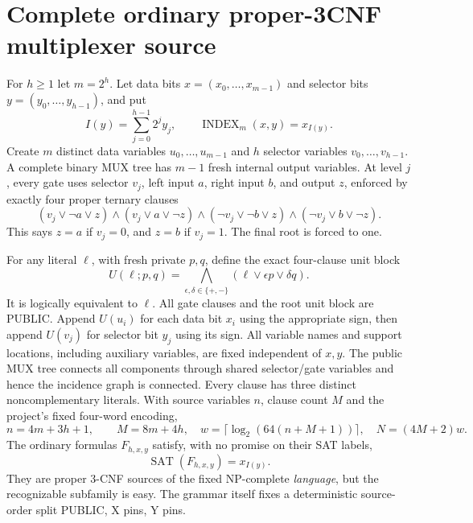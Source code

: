 \documentclass[11pt]{article}
\newcommand{\SAT}{\operatorname{SAT}}
\begin{document}
\section{Complete ordinary proper-3CNF multiplexer source}
For $h\ge1$ let $m=2^h$. Let data bits $x=(x_0,\ldots,x_{m-1})$ and selector bits $y=(y_0,\ldots,y_{h-1})$, and put
\[
 I(y)=\sum_{j=0}^{h-1}2^jy_j,\qquad
 \operatorname{INDEX}_m(x,y)=x_{I(y)}.
\]
Create $m$ distinct data variables $u_0,\ldots,u_{m-1}$ and $h$ selector variables $v_0,\ldots,v_{h-1}$. A complete binary MUX tree has $m-1$ fresh internal output variables. At level $j$, every gate uses selector $v_j$, left input $a$, right input $b$, and output $z$, enforced by exactly four proper ternary clauses
\[
(v_j\vee\neg a\vee z)\land
(v_j\vee a\vee\neg z)\land
(\neg v_j\vee\neg b\vee z)\land
(\neg v_j\vee b\vee\neg z).
\tag{1}
\]
This says $z=a$ if $v_j=0$, and $z=b$ if $v_j=1$. The final root is forced to one.

For any literal $\ell$, with fresh private $p,q$, define the exact four-clause unit block
\[
U(\ell;p,q)=\bigwedge_{\epsilon,\delta\in\{+,-\}}
(\ell\vee\epsilon p\vee\delta q).
\tag{2}
\]
It is logically equivalent to $\ell$. All gate clauses and the root unit block are PUBLIC. Append $U(u_i)$ for each data bit $x_i$ using the appropriate sign, then append $U(v_j)$ for selector bit $y_j$ using its sign. All variable names and support locations, including auxiliary variables, are fixed independent of $x,y$. The public MUX tree connects all components through shared selector/gate variables and hence the incidence graph is connected. Every clause has three distinct noncomplementary literals. With source variables $n$, clause count $M$ and the project's fixed four-word encoding,
\[
\boxed{n=4m+3h+1,\qquad M=8m+4h,}\quad
w=\lceil\log_2(64(n+M+1))\rceil,\quad N=(4M+2)w.
\tag{3}
\]
The ordinary formulas $F_{h,x,y}$ satisfy, with no promise on their SAT labels,
\[
\boxed{\SAT(F_{h,x,y})=x_{I(y)}.}\tag{4}
\]
They are proper 3-CNF sources of the fixed NP-complete \emph{language}, but the recognizable subfamily is easy. The grammar itself fixes a deterministic source-order split PUBLIC, X pins, Y pins.
\end{document}
